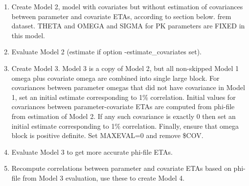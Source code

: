 \begin{enumerate}
\item Create Model 2, model with covariates but without
estimation of covariances between parameter and covariate ETAs,
according to section below. frem dataset.
THETA and OMEGA and SIGMA for PK parameters are FIXED in this model.
\item Evaluate Model 2 (estimate if option -estimate\_covariates set).
\item Create Model 3.
Model 3 is a copy of Model 2, but all non-skipped Model 1 omega plus covariate omega are combined
into single large block. For covariances between parameter omegas that did
not have covariance in Model 1, set %
an initial estimate corresponding to 1\% correlation.
Initial values for covariances between parameter-covariate ETAs are computed from
phi-file from estimation of Model 2. If any such covariance is exactly 0 then set
an initial estimate corresponding to 1\% correlation.
Finally, ensure that omega block is positive definite.
Set MAXEVAL=0 and remove \$COV.
\item Evaluate Model 3 to get more accurate phi-file ETAs.
\item Recompute correlations
between parameter and covariate ETAs based on phi-file from Model 3 evaluation,
use these to create Model 4.


\end{enumerate}
